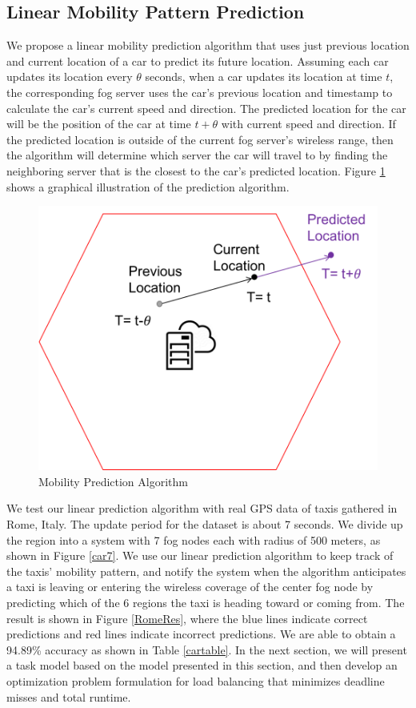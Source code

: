 \subsection{Linear Mobility Pattern Prediction}
\label{background:model}
We propose a linear mobility prediction algorithm that uses just previous location and current location of a car to predict its future location. Assuming each car updates its location every $\theta$ seconds, when a car updates its location at time $t$, the corresponding fog server uses the car's previous location and timestamp to calculate the car's current speed and direction. The predicted location for the car will be the position of the car at time $t+\theta$ with current speed and direction. If the predicted location is outside of the current fog server's wireless range, then the algorithm will determine which server the car will travel to by finding the neighboring server that is the closest to the car’s predicted location. Figure \ref{carmodelrep} shows a graphical illustration of the prediction algorithm. 

\begin{figure}[ht!]
\centering
\includegraphics[width=0.5\linewidth]{images/car_model_rep}
\caption{Mobility Prediction Algorithm}
\label{carmodelrep}
\end{figure}


We test our linear prediction algorithm with real GPS data of taxis gathered in Rome, Italy\cite{romet}. The update period for the dataset is about 7 seconds. We divide up the region into a system with 7 fog nodes each with radius of 500 meters, as shown in Figure \ref{car7}. We use our linear prediction algorithm to keep track of the taxis' mobility pattern, and notify the system when the algorithm anticipates a taxi is leaving or entering the wireless coverage of the center fog node by predicting which of the 6 regions the taxi is heading toward or coming from. The result is shown in Figure \ref{RomeRes}, where the blue lines indicate correct predictions and red lines indicate incorrect predictions. We are able to obtain a 94.89\% accuracy as shown in Table \ref{cartable}. In the next section, we will present a task model based on the model presented in this section, and then develop an optimization problem formulation for load balancing that minimizes deadline misses and total runtime.



